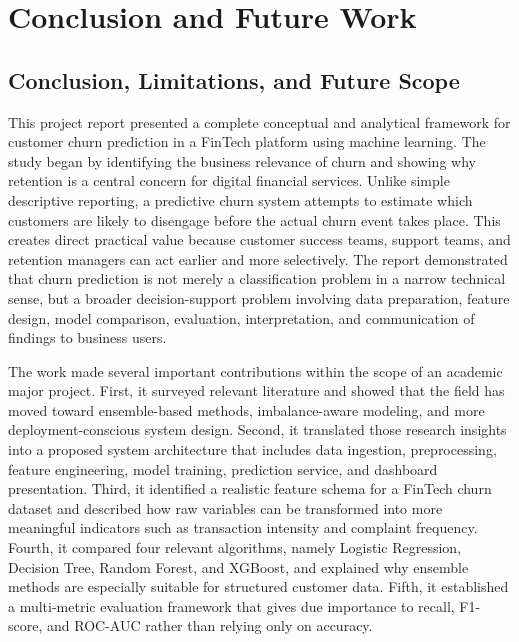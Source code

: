 \chapter{Conclusion and Future Work}

\section{Conclusion, Limitations, and Future Scope}
This project report presented a complete conceptual and analytical framework for customer churn prediction in a FinTech platform using machine learning. The study began by identifying the business relevance of churn and showing why retention is a central concern for digital financial services. Unlike simple descriptive reporting, a predictive churn system attempts to estimate which customers are likely to disengage before the actual churn event takes place. This creates direct practical value because customer success teams, support teams, and retention managers can act earlier and more selectively. The report demonstrated that churn prediction is not merely a classification problem in a narrow technical sense, but a broader decision-support problem involving data preparation, feature design, model comparison, evaluation, interpretation, and communication of findings to business users.

The work made several important contributions within the scope of an academic major project. First, it surveyed relevant literature and showed that the field has moved toward ensemble-based methods, imbalance-aware modeling, and more deployment-conscious system design. Second, it translated those research insights into a proposed system architecture that includes data ingestion, preprocessing, feature engineering, model training, prediction service, and dashboard presentation. Third, it identified a realistic feature schema for a FinTech churn dataset and described how raw variables can be transformed into more meaningful indicators such as transaction intensity and complaint frequency. Fourth, it compared four relevant algorithms, namely Logistic Regression, Decision Tree, Random Forest, and XGBoost, and explained why ensemble methods are especially suitable for structured customer data. Fifth, it established a multi-metric evaluation framework that gives due importance to recall, F1-score, and ROC-AUC rather than relying only on accuracy.


